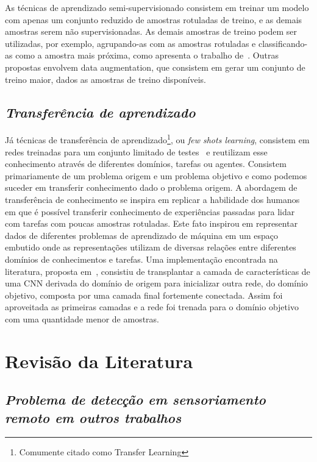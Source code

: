As técnicas de aprendizado semi-supervisionado consistem em treinar um modelo com apenas um conjunto reduzido de amostras rotuladas de treino, e as demais amostras serem não supervisionadas. As demais amostras de treino podem ser utilizadas, por exemplo, agrupando-as com as amostras rotuladas e classificando-as como a amostra mais próxima, como apresenta o trabalho de~\cite{Sanches2003}. Outras propostas envolvem data augmentation, que consistem em gerar um conjunto de treino maior, dados as amostras de treino disponíveis.

\subsection{\textit{Transferência de aprendizado}}\label{sec:Cap2_transfer}

Já técnicas de transferência de aprendizado\footnote{Comumente citado como Transfer Learning}, ou \textit{few shots learning}, consistem em redes treinadas para um conjunto limitado de testes~\cite{rostami2019learning}
e reutilizam esse conhecimento através de diferentes domínios, tarefas ou agentes. Consistem primariamente de um problema origem e um problema objetivo e como podemos suceder em transferir conhecimento dado o problema origem. A abordagem de transferência de conhecimento se inspira em replicar a habilidade dos humanos em que é possível transferir conhecimento de experiências passadas para lidar com tarefas com poucas amostras rotuladas. Este fato inspirou em representar dados de diferentes problemas de aprendizado de máquina em um espaço embutido onde as representações utilizam de diversas relações entre diferentes domínios de conhecimentos e tarefas. Uma implementação encontrada na literatura, proposta em~\cite{DBLP:journals/corr/abs-1811-04863}, consistiu de transplantar a camada de características de uma CNN derivada do domínio de origem para inicializar outra rede, do domínio objetivo, composta por uma camada final fortemente conectada. Assim foi aproveitada as primeiras camadas e a rede foi trenada para o domínio objetivo com uma quantidade menor de amostras.

\section{Revisão da Literatura}\label{sec:Cap2_revisao_literatura}

\subsection{\textit{Problema de detecção em sensoriamento remoto em outros trabalhos}}\label{sec:Cap2_outros_trabalhos}


